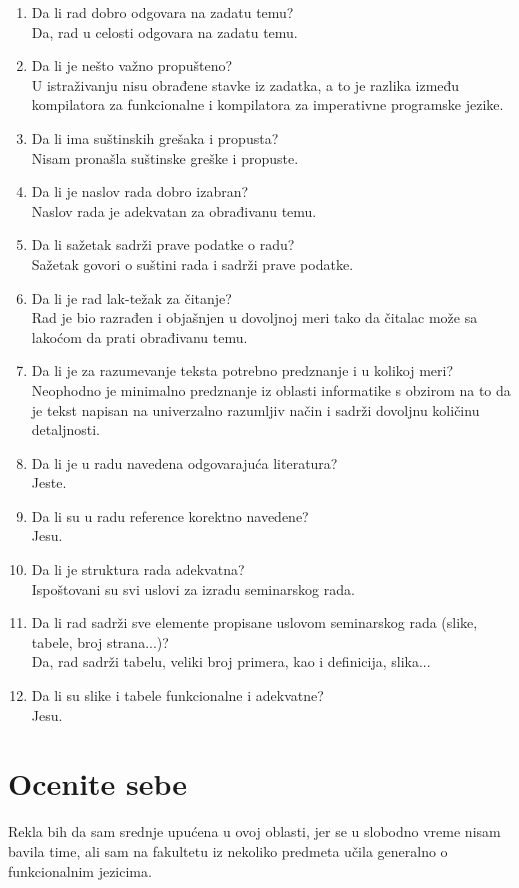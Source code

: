 \documentclass[a4paper]{report}
\begin{document}
\begin{enumerate}
\item Da li rad dobro odgovara na zadatu temu?\\
Da, rad u celosti odgovara na zadatu temu.
\item Da li je nešto važno propušteno?\\
U istraživanju nisu obrađene stavke iz zadatka, a to je razlika između kompilatora za funkcionalne i kompilatora za imperativne programske jezike.
\item Da li ima suštinskih grešaka i propusta?\\
Nisam pronašla suštinske greške i propuste.
\item Da li je naslov rada dobro izabran?\\
Naslov rada je adekvatan za obrađivanu temu.
\item Da li sažetak sadrži prave podatke o radu?\\
Sažetak govori o suštini rada i sadrži prave podatke.
\item Da li je rad lak-težak za čitanje?\\
Rad je bio razrađen i objašnjen u dovoljnoj meri tako da čitalac može sa lakoćom da prati obrađivanu temu.
\item Da li je za razumevanje teksta potrebno predznanje i u kolikoj meri?\\
Neophodno je minimalno predznanje iz oblasti informatike s obzirom na to da je tekst napisan na univerzalno razumljiv način i sadrži dovoljnu količinu detaljnosti.
\item Da li je u radu navedena odgovarajuća literatura?\\
Jeste.
\item Da li su u radu reference korektno navedene?\\
Jesu.
\item Da li je struktura rada adekvatna?\\
Ispoštovani su svi uslovi za izradu seminarskog rada.
\item Da li rad sadrži sve elemente propisane uslovom seminarskog rada (slike, tabele, broj strana...)?\\
Da, rad sadrži tabelu, veliki broj primera, kao i definicija, slika...
\item Da li su slike i tabele funkcionalne i adekvatne?\\
Jesu. 
\end{enumerate}

\section{Ocenite sebe}
Rekla bih da sam srednje upućena u ovoj oblasti, jer se u slobodno vreme nisam bavila time, ali sam na fakultetu iz nekoliko predmeta učila generalno o funkcionalnim jezicima.
\end{document}
